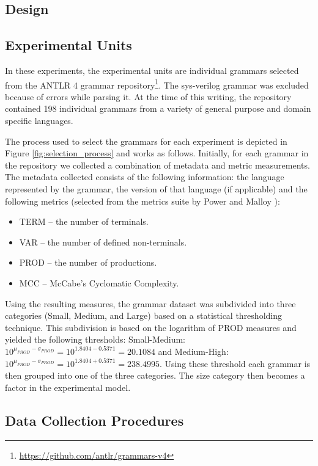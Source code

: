 \documentclass[10pt,nocc]{xrese_report}
\begin{document}
\subsection{Design}

\subsection{Experimental Units}

In these experiments, the experimental units are individual grammars selected from the ANTLR 4 \cite{parr_definitive_2012} grammar repository\footnote{\url{https://github.com/antlr/grammars-v4}}. The sys-verilog grammar was excluded because of errors while parsing it. At the time of this writing, the repository contained 198 individual grammars from a variety of general purpose and domain specific languages.

The process used to select the grammars for each experiment is depicted in Figure \ref{fig:selection_process} and works as follows. Initially, for each grammar in the repository we collected a combination of metadata and metric measurements. The metadata collected consists of the following information: the language represented by the grammar, the version of that language (if applicable) and the following metrics (selected from the metrics suite by Power and Malloy \cite{power_metrics_2004}):

\begin{itemize}
\item TERM -- the number of terminals.
\item VAR -- the number of defined non-terminals.
\item PROD -- the number of productions.
\item MCC -- McCabe's Cyclomatic Complexity.
\end{itemize}

Using the resulting measures, the grammar dataset was subdivided into three categories (Small, Medium, and Large) based on a statistical thresholding technique. This subdivision is based on the logarithm of PROD measures and yielded the following thresholds: Small-Medium: $10^{\mu_{PROD}-\sigma_{PROD}} = 10^{1.8404-0.5371} = 20.1084$ and Medium-High: $10^{\mu_{PROD}-\sigma_{PROD}} = 10^{1.8404+0.5371} = 238.4995$. Using these threshold each grammar is then grouped into one of the three categories. The size category then becomes a factor in the experimental model. 



\subsection{Data Collection Procedures}
\end{document}
